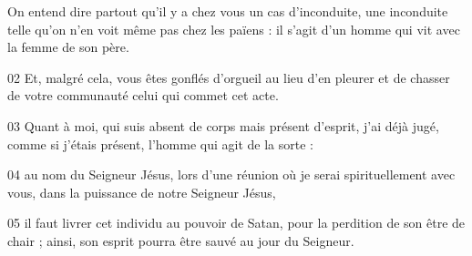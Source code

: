 On entend dire partout qu’il y a chez vous un cas d’inconduite, une inconduite telle qu’on n’en voit même pas chez les païens : il s’agit d’un homme qui vit avec la femme de son père.

02 Et, malgré cela, vous êtes gonflés d’orgueil au lieu d’en pleurer et de chasser de votre communauté celui qui commet cet acte.

03 Quant à moi, qui suis absent de corps mais présent d’esprit, j’ai déjà jugé, comme si j’étais présent, l’homme qui agit de la sorte :

04 au nom du Seigneur Jésus, lors d’une réunion où je serai spirituellement avec vous, dans la puissance de notre Seigneur Jésus,

05 il faut livrer cet individu au pouvoir de Satan, pour la perdition de son être de chair ; ainsi, son esprit pourra être sauvé au jour du Seigneur.
